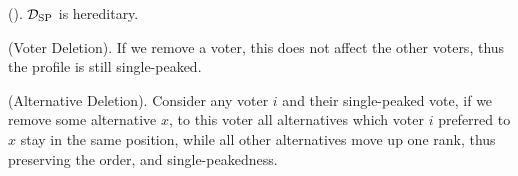 \begin{proposition}{\textnormal{(\citet{elkindPreferenceRestrictionsComputational2022}).}}
	$\mathcal{D}_{\textnormal{SP}}$ is hereditary.
\end{proposition}

\begin{proofc}
	(Voter Deletion). If we remove a voter, this does not affect the other voters, thus the profile is still single-peaked.~\checkmark

	(Alternative Deletion). Consider any voter $i$ and their single-peaked vote, if we remove some alternative $x$, to this voter all alternatives which voter $i$ preferred to $x$ stay in the same position, while all other alternatives move up one rank, thus preserving the order, and single-peakedness.~\checkmark
\end{proofc}


%
%
%
%
%

